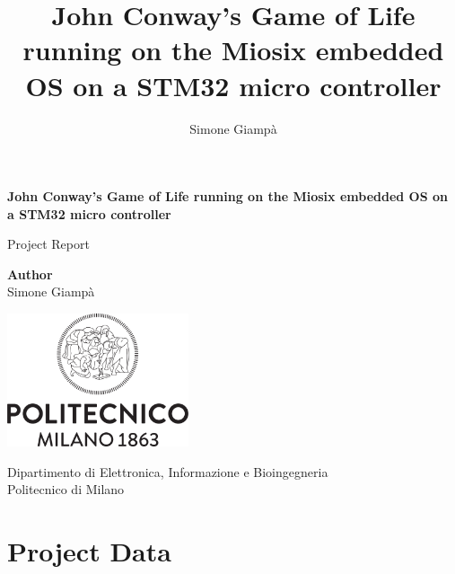 \documentclass[10pt]{article}
\author{Simone Giampà}
\title{John Conway's Game of Life running on the Miosix embedded OS on a STM32 micro controller}
\begin{document}
    \begin{titlepage}
        \begin{center}
            \vspace*{3cm}

            \textbf{\Large John Conway's Game of Life running on the Miosix embedded OS on a STM32 micro controller}

            \vspace{1.5cm}
            \large Project Report

            \vfill

            \textbf{Author}\\Simone Giampà

            \vspace{0.8cm}

            \includegraphics[width=0.4\textwidth]{images/Logo_Politecnico_Milano.png}

            \vspace{0.5cm}

            Dipartimento di Elettronica, Informazione e Bioingegneria\\
            Politecnico di Milano\\
        \end{center}
    \end{titlepage}


    \tableofcontents
    \newpage

    \section{Project Data}
\end{document}
